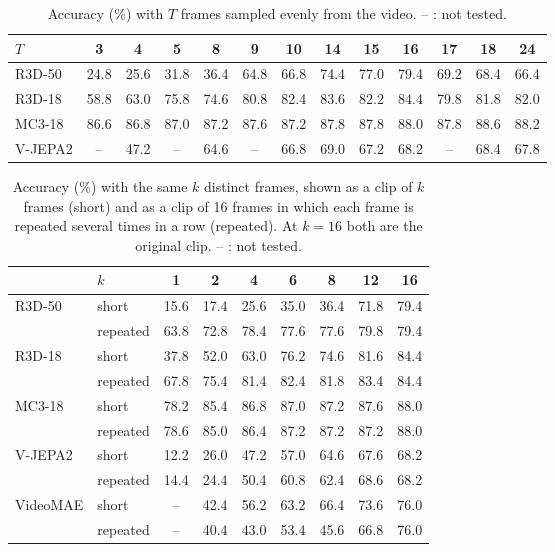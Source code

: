 \begin{table}[h]
\centering
\caption{Accuracy (\%) with $T$ frames sampled evenly from the video. -- : not tested.}
\label{tab:length-t2}
\setlength{\tabcolsep}{4pt}
\begin{tabular}{lcccccccccccc}
\toprule
$T$ & 3 & 4 & 5 & 8 & 9 & 10 & 14 & 15 & 16 & 17 & 18 & 24 \\
\midrule
R3D-50  & 24.8 & 25.6 & 31.8 & 36.4 & 64.8 & 66.8 & 74.4 & 77.0 & 79.4 & 69.2 & 68.4 & 66.4 \\
R3D-18  & 58.8 & 63.0 & 75.8 & 74.6 & 80.8 & 82.4 & 83.6 & 82.2 & 84.4 & 79.8 & 81.8 & 82.0 \\
MC3-18  & 86.6 & 86.8 & 87.0 & 87.2 & 87.6 & 87.2 & 87.8 & 87.8 & 88.0 & 87.8 & 88.6 & 88.2 \\
V-JEPA2 & --   & 47.2 & --   & 64.6 & --   & 66.8 & 69.0 & 67.2 & 68.2 & --   & 68.4 & 67.8 \\
\bottomrule
\end{tabular}
\end{table}

\begin{table}[h]
\centering
\caption{Accuracy (\%) with the same $k$ distinct frames, shown as a clip of $k$ frames (short) and as a clip of 16 frames in which each frame is repeated several times in a row (repeated). At $k = 16$ both are the original clip. -- : not tested.}
\label{tab:length-t3}
\begin{tabular}{llccccccc}
\toprule
 & $k$ & 1 & 2 & 4 & 6 & 8 & 12 & 16 \\
\midrule
R3D-50   & short    & 15.6 & 17.4 & 25.6 & 35.0 & 36.4 & 71.8 & 79.4 \\
         & repeated & 63.8 & 72.8 & 78.4 & 77.6 & 77.6 & 79.8 & 79.4 \\
\midrule
R3D-18   & short    & 37.8 & 52.0 & 63.0 & 76.2 & 74.6 & 81.6 & 84.4 \\
         & repeated & 67.8 & 75.4 & 81.4 & 82.4 & 81.8 & 83.4 & 84.4 \\
\midrule
MC3-18   & short    & 78.2 & 85.4 & 86.8 & 87.0 & 87.2 & 87.6 & 88.0 \\
         & repeated & 78.6 & 85.0 & 86.4 & 87.2 & 87.2 & 87.2 & 88.0 \\
\midrule
V-JEPA2  & short    & 12.2 & 26.0 & 47.2 & 57.0 & 64.6 & 67.6 & 68.2 \\
         & repeated & 14.4 & 24.4 & 50.4 & 60.8 & 62.4 & 68.6 & 68.2 \\
\midrule
VideoMAE & short    & --   & 42.4 & 56.2 & 63.2 & 66.4 & 73.6 & 76.0 \\
         & repeated & --   & 40.4 & 43.0 & 53.4 & 45.6 & 66.8 & 76.0 \\
\bottomrule
\end{tabular}
\end{table}

